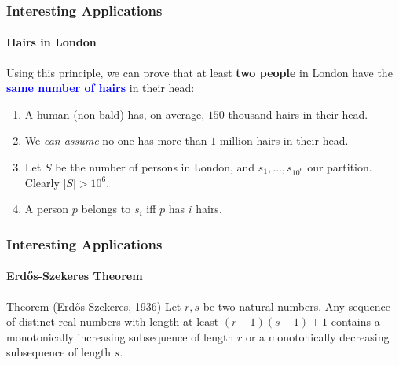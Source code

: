 \documentclass[9pt,    %
    english,            %
    xcolor=table,       %
    envcountsect,        %
    aspectratio=169     %
]{beamer}
\begin{document}
\begin{frame}
    \frametitle{Interesting Applications}
    \framesubtitle{Hairs in London}

    \vspace{-20pt}

    Using this principle, we can prove that at least \textbf{two people} in London have the \textbf{\textcolor{blue}{same number of hairs}} in their head:

    \begin{enumerate}
        \item<2-> A human (non-bald) has, on average, $150$ thousand hairs in their head.
        \item<3-> We \emph{can assume} no one has more than $1$ million hairs in their head.
        \item<4-> Let $S$ be the number of persons in London, and $s_1, \dots, s_{10^6}$ our partition.
            Clearly $|S| > 10^6$.
        \item<5-> A person $p$ belongs to $s_i$ iff $p$ has $i$ hairs.
    \end{enumerate}


\end{frame}

\begin{frame}
    \frametitle{Interesting Applications}
    \framesubtitle{Erd\H{o}s-Szekeres Theorem}

    \begin{alertblock}{Theorem (Erd\H{o}s-Szekeres, 1936)}
        Let $r,s$ be two natural numbers.
        Any sequence of distinct real numbers with length at least $(r-1)(s-1) + 1$ contains a monotonically increasing subsequence of length $r$ or a monotonically decreasing subsequence of length $s$.
    \end{alertblock}

    \vspace{10pt}


\end{frame}
\end{document}
